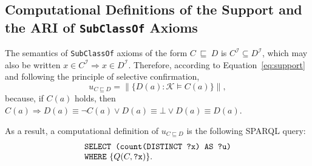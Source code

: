 \documentclass{llncs}
\begin{document}
\subsection{Computational Definitions of the Support and the ARI of \texttt{SubClassOf} Axioms}
\label{comp-def-content}

The semantics of \texttt{SubClassOf} axioms of the form $C~\sqsubseteq~D$ is $C^\mathcal{I} \subseteq D^\mathcal{I}$,
which may also be written $x \in C^\mathcal{I} \Rightarrow x \in D^\mathcal{I}$.
Therefore, according to Equation~\ref{eq:support} and
following the principle of selective confirmation,
\begin{equation}
  u_{C \sqsubseteq D} = \| \{D(a) : \mathcal{K} \models C(a) \} \|,
\end{equation}
because, if $C(a)$ holds, then $C(a) \Rightarrow D(a) \equiv \neg C(a) \lor D(a) \equiv \bot \lor D(a) \equiv D(a)$.

\noindent
As a result, a computational definition of $u_{C \sqsubseteq D}$ is the following SPARQL query:
\begin{equation}
  \begin{minipage}[c]{5in}
    \begin{tabbing}
      \quad\=\quad\=\quad\=\kill
      \texttt{SELECT (count(DISTINCT ?x) AS ?u)}\\
      \texttt{WHERE} \{$Q(C, \mbox{\tt ?x})$\}.
    \end{tabbing}
  \end{minipage}
\end{equation}
\end{document}
